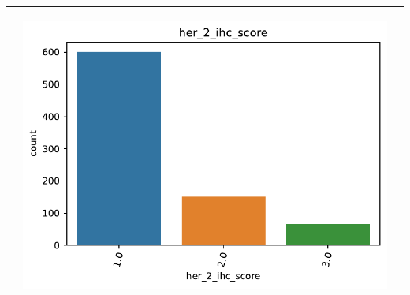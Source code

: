 \begin{table}[!htb]
\begin{threeparttable}
\begin{tabular}{p{2.5cm} p{7cm} p{6.5cm}}
			& \begin{center}\includegraphics[width=1\linewidth]{NOTEBOOK/IMAGENES_DESCRIPTIVAS/21_her_2_ihc_score}\end{center}
			\\ \hline
			

\end{tabular}
\end{threeparttable}
\end{table}
